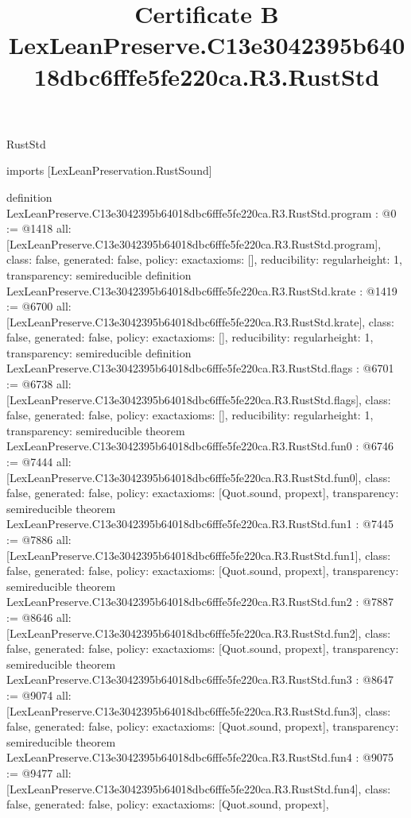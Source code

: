 \begin{lexlean}{RustStd}
\title{Certificate B LexLeanPreserve.C13e3042395b64018dbc6fffe5fe220ca.R3.RustStd}
\begin{coremodule}
imports [LexLeanPreservation.RustSound]

definition LexLeanPreserve.C13e3042395b64018dbc6fffe5fe220ca.R3.RustStd.program : @0 := @1418 {
  all: [LexLeanPreserve.C13e3042395b64018dbc6fffe5fe220ca.R3.RustStd.program],
  class: false,
  generated: false,
  policy: exact{axioms: []},
  reducibility: regular{height: 1},
  transparency: semireducible
}
definition LexLeanPreserve.C13e3042395b64018dbc6fffe5fe220ca.R3.RustStd.krate : @1419 := @6700 {
  all: [LexLeanPreserve.C13e3042395b64018dbc6fffe5fe220ca.R3.RustStd.krate],
  class: false,
  generated: false,
  policy: exact{axioms: []},
  reducibility: regular{height: 1},
  transparency: semireducible
}
definition LexLeanPreserve.C13e3042395b64018dbc6fffe5fe220ca.R3.RustStd.flags : @6701 := @6738 {
  all: [LexLeanPreserve.C13e3042395b64018dbc6fffe5fe220ca.R3.RustStd.flags],
  class: false,
  generated: false,
  policy: exact{axioms: []},
  reducibility: regular{height: 1},
  transparency: semireducible
}
theorem LexLeanPreserve.C13e3042395b64018dbc6fffe5fe220ca.R3.RustStd.fun0 : @6746 := @7444 {
  all: [LexLeanPreserve.C13e3042395b64018dbc6fffe5fe220ca.R3.RustStd.fun0],
  class: false,
  generated: false,
  policy: exact{axioms: [Quot.sound, propext]},
  transparency: semireducible
}
theorem LexLeanPreserve.C13e3042395b64018dbc6fffe5fe220ca.R3.RustStd.fun1 : @7445 := @7886 {
  all: [LexLeanPreserve.C13e3042395b64018dbc6fffe5fe220ca.R3.RustStd.fun1],
  class: false,
  generated: false,
  policy: exact{axioms: [Quot.sound, propext]},
  transparency: semireducible
}
theorem LexLeanPreserve.C13e3042395b64018dbc6fffe5fe220ca.R3.RustStd.fun2 : @7887 := @8646 {
  all: [LexLeanPreserve.C13e3042395b64018dbc6fffe5fe220ca.R3.RustStd.fun2],
  class: false,
  generated: false,
  policy: exact{axioms: [Quot.sound, propext]},
  transparency: semireducible
}
theorem LexLeanPreserve.C13e3042395b64018dbc6fffe5fe220ca.R3.RustStd.fun3 : @8647 := @9074 {
  all: [LexLeanPreserve.C13e3042395b64018dbc6fffe5fe220ca.R3.RustStd.fun3],
  class: false,
  generated: false,
  policy: exact{axioms: [Quot.sound, propext]},
  transparency: semireducible
}
theorem LexLeanPreserve.C13e3042395b64018dbc6fffe5fe220ca.R3.RustStd.fun4 : @9075 := @9477 {
  all: [LexLeanPreserve.C13e3042395b64018dbc6fffe5fe220ca.R3.RustStd.fun4],
  class: false,
  generated: false,
  policy: exact{axioms: [Quot.sound, propext]},
}
\end{coremodule}
\end{lexlean}
